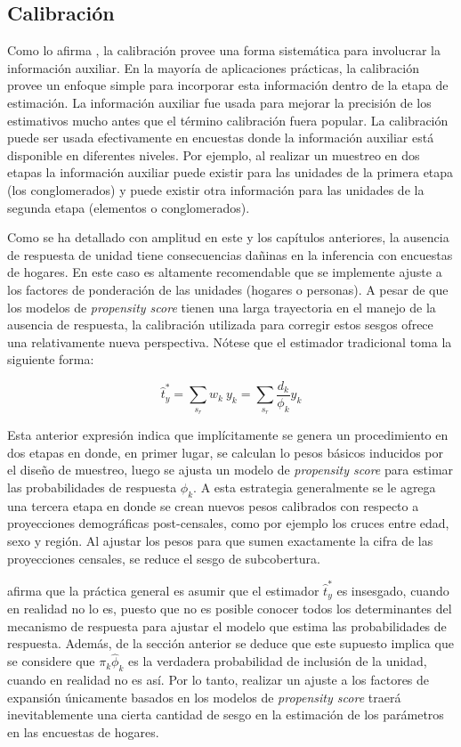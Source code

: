 \documentclass[
  12pt,
]{book}
\begin{document}
\hypertarget{calibraciuxf3n}{%
\subsection{Calibración}\label{calibraciuxf3n}}

Como lo afirma \citet{Sar08}, la calibración provee una forma sistemática para involucrar la información auxiliar. En la mayoría de aplicaciones prácticas, la calibración provee un enfoque simple para incorporar esta información dentro de la etapa de estimación. La información auxiliar fue usada para mejorar la precisión de los estimativos mucho antes que el término calibración fuera popular. La calibración puede ser usada efectivamente en encuestas donde la información auxiliar está disponible en diferentes niveles. Por ejemplo, al realizar un muestreo en dos etapas la información auxiliar puede existir para las unidades de la primera etapa (los conglomerados) y puede existir otra información para las unidades de la segunda etapa (elementos o conglomerados).

Como se ha detallado con amplitud en este y los capítulos anteriores, la ausencia de respuesta de unidad tiene consecuencias dañinas en la inferencia con encuestas de hogares. En este caso es altamente recomendable que se implemente ajuste a los factores de ponderación de las unidades (hogares o personas). A pesar de que los modelos de \emph{propensity score} tienen una larga trayectoria en el manejo de la ausencia de respuesta, la calibración utilizada para corregir estos sesgos ofrece una relativamente nueva perspectiva. Nótese que el estimador tradicional toma la siguiente forma:

\[
\hat t_y^* = \sum_{s_r} w_k\ y_k = \sum_{s_r} \frac{d_k}{\phi_k} y_k 
\]

Esta anterior expresión indica que implícitamente se genera un procedimiento en dos etapas en donde, en primer lugar, se calculan lo pesos básicos inducidos por el diseño de muestreo, luego se ajusta un modelo de \emph{propensity score} para estimar las probabilidades de respuesta \(\phi_k\). A esta estrategia generalmente se le agrega una tercera etapa en donde se crean nuevos pesos calibrados con respecto a proyecciones demográficas post-censales, como por ejemplo los cruces entre edad, sexo y región. Al ajustar los pesos para que sumen exactamente la cifra de las proyecciones censales, se reduce el sesgo de subcobertura.

\citet{Sar08} afirma que la práctica general es asumir que el estimador \(\hat t_y^*\) es insesgado, cuando en realidad no lo es, puesto que no es posible conocer todos los determinantes del mecanismo de respuesta para ajustar el modelo que estima las probabilidades de respuesta. Además, de la sección anterior se deduce que este supuesto implica que se considere que \(\pi_k \hat\phi_k\) es la verdadera probabilidad de inclusión de la unidad, cuando en realidad no es así. Por lo tanto, realizar un ajuste a los factores de expansión únicamente basados en los modelos de \emph{propensity score} traerá inevitablemente una cierta cantidad de sesgo en la estimación de los parámetros en las encuestas de hogares.
\end{document}
